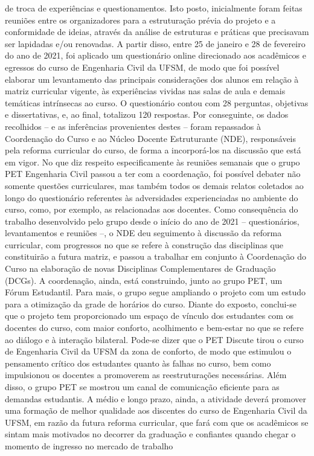 de troca de experiências e questionamentos. Isto posto, inicialmente foram feitas reuniões entre os 
organizadores para a estruturação prévia do projeto e a conformidade de ideias, através da análise 
de estruturas e práticas que precisavam ser lapidadas e/ou renovadas. A partir disso, entre 25 de 
janeiro e 28 de fevereiro do ano de 2021, foi aplicado um questionário online direcionado aos 
acadêmicos e egressos do curso de Engenharia Civil da UFSM, de modo que foi possível elaborar 
um levantamento das principais considerações dos alunos em relação à matriz curricular vigente, 
às experiências vividas nas salas de aula e demais temáticas intrínsecas ao curso. O questionário 
contou com 28 perguntas, objetivas e dissertativas, e, ao final, totalizou 120 respostas. Por 
conseguinte, os dados recolhidos – e as inferências provenientes destes – foram repassados à 
Coordenação do Curso e ao Núcleo Docente Estruturante (NDE), responsáveis pela reforma 
curricular do curso, de forma a incorporá-los na discussão que está em vigor. No que diz respeito 
especificamente às reuniões semanais que o grupo PET Engenharia Civil passou a ter com a 
coordenação, foi possível debater não somente questões curriculares, mas também todos os demais 
relatos coletados ao longo do questionário referentes às adversidades experienciadas no ambiente 
do curso, como, por exemplo, as relacionadas aos docentes. Como consequência do trabalho 
desenvolvido pelo grupo desde o início do ano de 2021 – questionários, levantamentos e reuniões 
–, o NDE deu seguimento à discussão da reforma curricular, com progressos no que se refere à 
construção das disciplinas que constituirão a futura matriz, e passou a trabalhar em conjunto à 
Coordenação do Curso na elaboração de novas Disciplinas Complementares de Graduação 
(DCGs). A coordenação, ainda, está construindo, junto ao grupo PET, um Fórum Estudantil. Para 
mais, o grupo segue ampliando o projeto com um estudo para a otimização da grade de horários 
do curso. Diante do exposto, conclui-se que o projeto tem proporcionado um espaço de vínculo 
dos estudantes com os docentes do curso, com maior conforto, acolhimento e bem-estar no que se 
refere ao diálogo e à interação bilateral. Pode-se dizer que o PET Discute tirou o curso de 
Engenharia Civil da UFSM da zona de conforto, de modo que estimulou o pensamento crítico dos 
estudantes quanto às falhas no curso, bem como impulsionou os docentes a promoverem as 
reestruturações necessárias. Além disso, o grupo PET se mostrou um canal de comunicação 
eficiente para as demandas estudantis. A médio e longo prazo, ainda, a atividade deverá promover 
uma formação de melhor qualidade aos discentes do curso de Engenharia Civil da UFSM, em 
razão da futura reforma curricular, que fará com que os acadêmicos se sintam mais motivados no 
decorrer da graduação e confiantes quando chegar o momento de ingresso no mercado de trabalho

